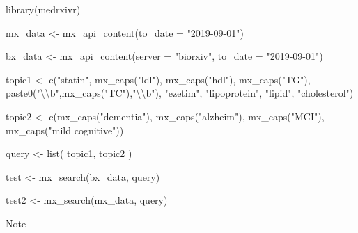 \documentclass[a4paper, twoside]{templates/ociamthesis}
\newenvironment{Shaded}{\begin{snugshade}}{\end{snugshade}}
\newcommand{\AttributeTok}[1]{\textcolor[rgb]{0.77,0.63,0.00}{#1}}
\newcommand{\FunctionTok}[1]{\textcolor[rgb]{0.00,0.00,0.00}{#1}}
\newcommand{\NormalTok}[1]{#1}
\newcommand{\OtherTok}[1]{\textcolor[rgb]{0.56,0.35,0.01}{#1}}
\newcommand{\SpecialCharTok}[1]{\textcolor[rgb]{0.00,0.00,0.00}{#1}}
\newcommand{\StringTok}[1]{\textcolor[rgb]{0.31,0.60,0.02}{#1}}
\renewenvironment{Shaded}
{
  \vspace{4pt}%
  \begin{snugshade}%
}{%
  \end{snugshade}%
  \vspace{4pt}%
}
\begin{document}
\begin{Shaded}
\begin{Highlighting}[]
\FunctionTok{library}\NormalTok{(medrxivr)}

\NormalTok{mx\_data }\OtherTok{\textless{}{-}} \FunctionTok{mx\_api\_content}\NormalTok{(}\AttributeTok{to\_date =} \StringTok{"2019{-}09{-}01"}\NormalTok{)}

\NormalTok{bx\_data }\OtherTok{\textless{}{-}} \FunctionTok{mx\_api\_content}\NormalTok{(}\AttributeTok{server =} \StringTok{"biorxiv"}\NormalTok{,}
                                    \AttributeTok{to\_date =} \StringTok{"2019{-}09{-}01"}\NormalTok{)}

\NormalTok{topic1 }\OtherTok{\textless{}{-}} \FunctionTok{c}\NormalTok{(}\StringTok{"statin"}\NormalTok{,}
            \FunctionTok{mx\_caps}\NormalTok{(}\StringTok{"ldl"}\NormalTok{),}
            \FunctionTok{mx\_caps}\NormalTok{(}\StringTok{"hdl"}\NormalTok{),}
            \FunctionTok{mx\_caps}\NormalTok{(}\StringTok{"TG"}\NormalTok{),}
            \FunctionTok{paste0}\NormalTok{(}\StringTok{"}\SpecialCharTok{\textbackslash{}\textbackslash{}}\StringTok{b"}\NormalTok{,}\FunctionTok{mx\_caps}\NormalTok{(}\StringTok{"TC"}\NormalTok{),}\StringTok{"}\SpecialCharTok{\textbackslash{}\textbackslash{}}\StringTok{b"}\NormalTok{),}
            \StringTok{"ezetim"}\NormalTok{,}
            \StringTok{"lipoprotein"}\NormalTok{,}
            \StringTok{"lipid"}\NormalTok{,}
            \StringTok{"cholesterol"}\NormalTok{)}

\NormalTok{topic2 }\OtherTok{\textless{}{-}} \FunctionTok{c}\NormalTok{(}\FunctionTok{mx\_caps}\NormalTok{(}\StringTok{"dementia"}\NormalTok{),}
            \FunctionTok{mx\_caps}\NormalTok{(}\StringTok{"alzheim"}\NormalTok{),}
            \FunctionTok{mx\_caps}\NormalTok{(}\StringTok{"MCI"}\NormalTok{),}
            \FunctionTok{mx\_caps}\NormalTok{(}\StringTok{"mild cognitive"}\NormalTok{))}

\NormalTok{query }\OtherTok{\textless{}{-}} \FunctionTok{list}\NormalTok{(}
\NormalTok{  topic1,}
\NormalTok{  topic2}
\NormalTok{)}

\NormalTok{test }\OtherTok{\textless{}{-}} \FunctionTok{mx\_search}\NormalTok{(bx\_data, query)}


\NormalTok{test2 }\OtherTok{\textless{}{-}} \FunctionTok{mx\_search}\NormalTok{(mx\_data, query)}
\end{Highlighting}
\end{Shaded}

Note
\end{document}
